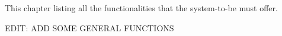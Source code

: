 This chapter listing all the functionalities that the system-to-be must offer.

EDIT: ADD SOME GENERAL FUNCTIONS